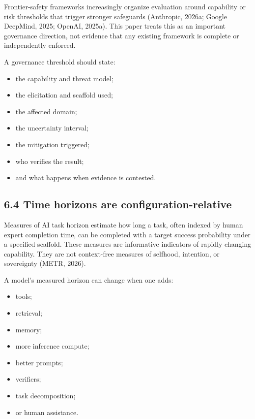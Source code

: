 \documentclass[
  11pt,
]{article}
\providecommand{\tightlist}{%
  \setlength{\itemsep}{0pt}\setlength{\parskip}{0pt}}
\begin{document}
Frontier-safety frameworks increasingly organize evaluation around
capability or risk thresholds that trigger stronger safeguards
(Anthropic, 2026a; Google DeepMind, 2025; OpenAI, 2025a). This paper
treats this as an important governance direction, not evidence that any
existing framework is complete or independently enforced.

A governance threshold should state:

\begin{itemize}
\tightlist
\item
  the capability and threat model;
\item
  the elicitation and scaffold used;
\item
  the affected domain;
\item
  the uncertainty interval;
\item
  the mitigation triggered;
\item
  who verifies the result;
\item
  and what happens when evidence is contested.
\end{itemize}

\subsection{6.4 Time horizons are
configuration-relative}\label{time-horizons-are-configuration-relative}

Measures of AI task horizon estimate how long a task, often indexed by
human expert completion time, can be completed with a target success
probability under a specified scaffold. These measures are informative
indicators of rapidly changing capability. They are not context-free
measures of selfhood, intention, or sovereignty (METR, 2026).

A model's measured horizon can change when one adds:

\begin{itemize}
\tightlist
\item
  tools;
\item
  retrieval;
\item
  memory;
\item
  more inference compute;
\item
  better prompts;
\item
  verifiers;
\item
  task decomposition;
\item
  or human assistance.
\end{itemize}
\end{document}
